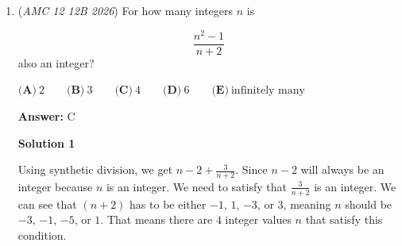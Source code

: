 \begin{enumerate}
 Substituting $n = 2026$ gives:
 \[2(2026) + 1 = 4053\]

 Therefore, the correct answer is $\boxed{\textbf{(B) } 4053}$.

 



\textbf{Solution 5}

The region inside the circle is administered into three parts: the $n$ gon, the $n$ triangles as the extensions of the $n$-gon, and the circular regions inscribed between the triangle. The total count of regions is $n+n+1 = 2n+1$ hence the answer is $\boxed{\textbf{(B) }4053}$.

 



\textbf{Solution 6}

Each of the 2026 points on the circle is a vertex of exactly one triangular region and two circular regions. Since each circular region has exactly two vertices lying on the circle, we can associate each point with one circular region and the triangular region, giving us two regions per point. Thus, we get $2026\cdot 2=4052$. However, this does not account for the 2026-gon in the middle, so we add 1 to obtain $\boxed{\textbf{(B) }4053}$.

 -C8c8c8c8c-Edits by Happymaths

 



\textbf{Solution 7 (Cheese)}

We notice that for $10$ equally spaced points, there are $21$ interior regions, so we guess that for $n$ points, there are $2n+1$ regions. Plugging $n=2026$, we get $2(2026)+1=\boxed{4053}$.

 


	\item (\textit{AMC 12 12B 2026}) For how many integers $n$ is

 \[\frac{n^{2}-1}{n+2}\]
also an integer?


 $\textbf{(A)}\   2  \qquad                 \textbf{(B)}\   3  \qquad                 \textbf{(C)}\   4  \qquad                 \textbf{(D)}\   6  \qquad                 \textbf{(E)}\   \text{infinitely many}$

 \textbf{Answer: }C



\textbf{Solution 1}

Using synthetic division, we get \(n-2+\frac{3}{n+2}\). Since \(n-2\) will always be an integer because \(n\) is an integer. We need to satisfy that \(\frac{3}{n+2}\) is an integer. We can see that \((n+2)\) has to be either \(-1\), \(1\), \(-3\), or \(3\), meaning \(n\) should be \(-3\), \(-1\), \(-5\), or \(1\). That means there are $\boxed{4}$ integer values \(n\) that satisfy this condition. 


\end{enumerate}
